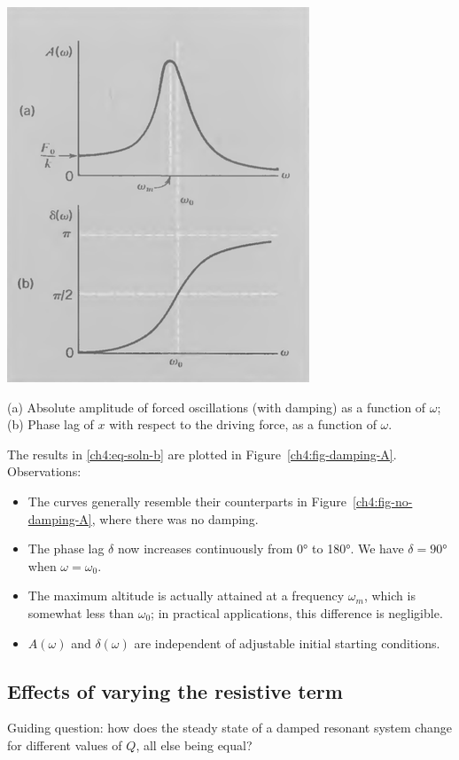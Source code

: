 \begin{marginfigure}
	\centering
	\includegraphics[scale=0.5]{phys232/Ch4-forced-damping-A.png} \caption{(a) Absolute amplitude of forced oscillations (with damping) as a function of $\omega$; (b) Phase lag of $x$ with respect to the driving force, as a function of $\omega$.}	\label{ch4:fig-damping-A}
\end{marginfigure}

The results in \eqref{ch4:eq-soln-b} are plotted in Figure~\ref{ch4:fig-damping-A}. Observations:
\begin{itemize}
	\item The curves generally resemble their counterparts in Figure~\ref{ch4:fig-no-damping-A}, where there was no damping.
	\item The phase lag $\delta$ now increases continuously from 0° to 180°. We have $\delta=90$° when $\omega=\omega_0$.
	\item The maximum altitude is actually attained at a frequency $\omega_m$, which is somewhat less than $\omega_0$; in practical applications, this difference is negligible.
	\item $A(\omega)$ and $\delta(\omega)$ are independent of adjustable initial starting conditions.
\end{itemize}

\subsection{Effects of varying the resistive term}
Guiding question: how does the steady state of a damped resonant system change for different values of $Q$, all else being equal?

